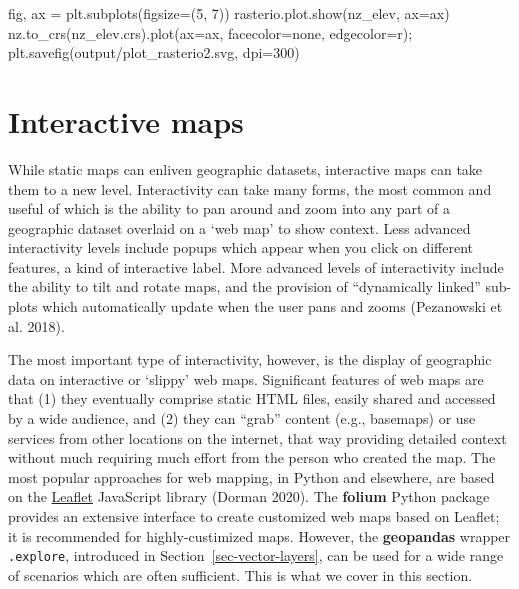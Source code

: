 \documentclass[
  letterpaper,
]{krantz}
\newenvironment{Shaded}{\begin{snugshade}}{\end{snugshade}}
\newcommand{\DecValTok}[1]{\textcolor[rgb]{0.68,0.00,0.00}{#1}}
\newcommand{\NormalTok}[1]{\textcolor[rgb]{0.00,0.23,0.31}{#1}}
\newcommand{\OperatorTok}[1]{\textcolor[rgb]{0.37,0.37,0.37}{#1}}
\newcommand{\StringTok}[1]{\textcolor[rgb]{0.13,0.47,0.30}{#1}}
\begin{document}
\begin{Shaded}
\begin{Highlighting}[]
\NormalTok{fig, ax }\OperatorTok{=}\NormalTok{ plt.subplots(figsize}\OperatorTok{=}\NormalTok{(}\DecValTok{5}\NormalTok{, }\DecValTok{7}\NormalTok{))}
\NormalTok{rasterio.plot.show(nz\_elev, ax}\OperatorTok{=}\NormalTok{ax)}
\NormalTok{nz.to\_crs(nz\_elev.crs).plot(ax}\OperatorTok{=}\NormalTok{ax, facecolor}\OperatorTok{=}\StringTok{\textquotesingle{}none\textquotesingle{}}\NormalTok{, edgecolor}\OperatorTok{=}\StringTok{\textquotesingle{}r\textquotesingle{}}\NormalTok{)}\OperatorTok{;}
\NormalTok{plt.savefig(}\StringTok{\textquotesingle{}output/plot\_rasterio2.svg\textquotesingle{}}\NormalTok{, dpi}\OperatorTok{=}\DecValTok{300}\NormalTok{)}
\end{Highlighting}
\end{Shaded}

\section{Interactive maps}\label{sec-interactive-maps}

While static maps can enliven geographic datasets, interactive maps can
take them to a new level. Interactivity can take many forms, the most
common and useful of which is the ability to pan around and zoom into
any part of a geographic dataset overlaid on a `web map' to show
context. Less advanced interactivity levels include popups which appear
when you click on different features, a kind of interactive label. More
advanced levels of interactivity include the ability to tilt and rotate
maps, and the provision of ``dynamically linked'' sub-plots which
automatically update when the user pans and zooms (Pezanowski et al.
2018).

The most important type of interactivity, however, is the display of
geographic data on interactive or `slippy' web maps. Significant
features of web maps are that (1) they eventually comprise static HTML
files, easily shared and accessed by a wide audience, and (2) they can
``grab'' content (e.g., basemaps) or use services from other locations
on the internet, that way providing detailed context without much
requiring much effort from the person who created the map. The most
popular approaches for web mapping, in Python and elsewhere, are based
on the \href{https://leafletjs.com/}{Leaflet} JavaScript library (Dorman
2020). The \textbf{folium} Python package provides an extensive
interface to create customized web maps based on Leaflet; it is
recommended for highly-custimized maps. However, the \textbf{geopandas}
wrapper \texttt{.explore}, introduced in
Section~\ref{sec-vector-layers}, can be used for a wide range of
scenarios which are often sufficient. This is what we cover in this
section.
\end{document}
